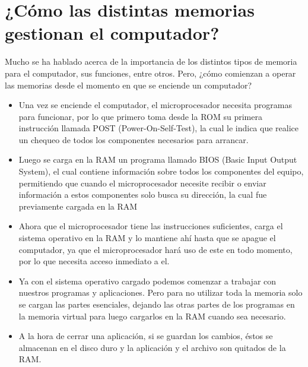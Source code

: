 \documentclass{article}
\begin{document}
\section{¿Cómo las distintas memorias gestionan el computador?} \label{contenido}
Mucho se ha hablado acerca de la importancia de los distintos tipos de memoria para el computador, sus funciones, entre otros. Pero, ¿cómo comienzan a operar las memorias desde el momento en que se enciende un computador?
\begin{itemize}

\item Una vez se enciende el computador, el microprocesador necesita programas para funcionar, por lo que primero toma desde la ROM su primera instrucción llamada POST (Power-On-Self-Test), la cual le indica que realice un chequeo de todos los componentes necesarios para arrancar.

\item Luego se carga en la RAM un programa llamado BIOS (Basic Input Output System), el cual contiene información sobre todos los componentes del equipo, permitiendo que cuando el microprocesador necesite recibir o enviar información a estos componentes solo busca su dirección, la cual fue previamente cargada en la RAM

\item Ahora que el microprocesador tiene las instrucciones suficientes, carga el sistema operativo en la RAM y lo mantiene ahí hasta que se apague el computador, ya que el microprocesador hará uso de este en todo momento, por lo que necesita acceso inmediato a el.

\item Ya con el sistema operativo cargado podemos comenzar a trabajar con nuestros programas y aplicaciones. Pero para no utilizar toda la memoria solo se cargan las partes esenciales, dejando las otras partes de los programas en la memoria virtual para luego cargarlos en la RAM cuando sea necesario.

\item A la hora de cerrar una aplicación, si se guardan los cambios, éstos se almacenan en el disco duro y la aplicación y el archivo son quitados de la RAM. \cite{referencia}

\end{itemize}
\end{document}

